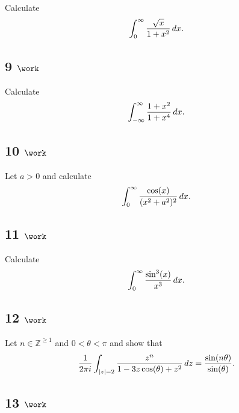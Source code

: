 Calculate
\begin{align*}
\int_0^\infty {\sqrt x \over 1 + x^2} \, dx
.\end{align*}

\hypertarget{work-56}{%
\subsection{\texorpdfstring{9
\(\work\)}{9 \textbackslash work}}\label{work-56}}

Calculate
\begin{align*}
\int_{-\infty}^\infty {1+x^2 \over 1+x^4}\, dx
.\end{align*}

\hypertarget{work-57}{%
\subsection{\texorpdfstring{10
\(\work\)}{10 \textbackslash work}}\label{work-57}}

Let \(a>0\) and calculate
\begin{align*}
\int_0^\infty {\cos(x) \over (x^2 + a^2)^2}\, dx
.\end{align*}

\hypertarget{work-58}{%
\subsection{\texorpdfstring{11
\(\work\)}{11 \textbackslash work}}\label{work-58}}

Calculate
\begin{align*}
\int_0^\infty {\sin^3(x) \over x^3} \, dx
.\end{align*}

\hypertarget{work-59}{%
\subsection{\texorpdfstring{12
\(\work\)}{12 \textbackslash work}}\label{work-59}}

Let \(n\in {\mathbb{Z}}^{\geq 1}\) and \(0<\theta<\pi\) and show that
\begin{align*}
{1\over 2\pi i} \int_{{\left\lvert {z} \right\rvert} = 2} {z^n \over 1 -3z\cos(\theta) + z^2} \,dz = {\sin(n\theta) \over \sin(\theta)}
.\end{align*}

\hypertarget{work-60}{%
\subsection{\texorpdfstring{13
\(\work\)}{13 \textbackslash work}}\label{work-60}}

